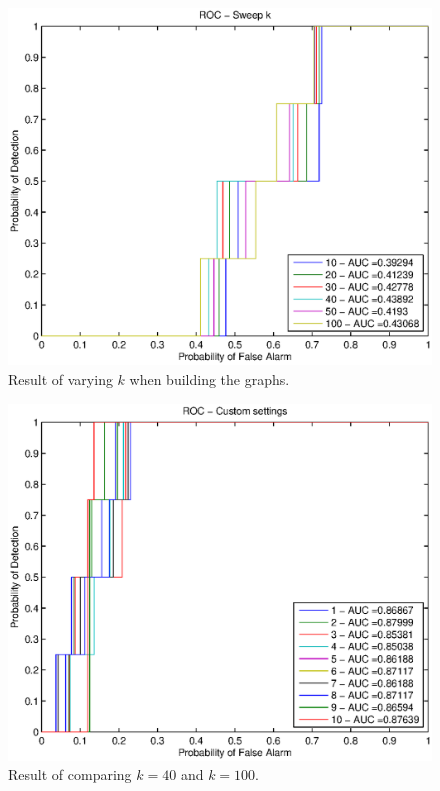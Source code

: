 \documentclass[conference]{IEEEtran}
\begin{document}



\begin{figure}
  \centering
  \includegraphics[width=0.9\linewidth]{k_sweep.eps}
  \caption{Result of varying $k$ when building the graphs.}
  \label{fig:test:k}
\end{figure}

\begin{figure}
  \centering
  \includegraphics[width=0.9\linewidth]{k_sweep_2.eps}
  \caption{Result of comparing $k = 40$ and $k = 100$.}
  \label{fig:test:k:2}
\end{figure}
\end{document}
